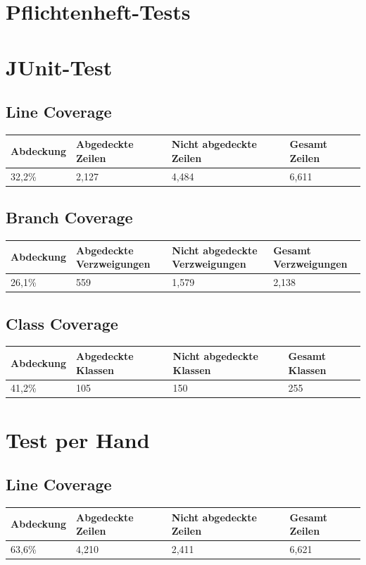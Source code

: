 \documentclass[10pt]{scrreprt}
\begin{document}
\section{Pflichtenheft-Tests}
\section{JUnit-Test}
\subsection{Line Coverage}
\begin{longtable}{|l|p{}|p{}|p{}|}
\hline
Abdeckung & Abgedeckte Zeilen & Nicht abgedeckte Zeilen & Gesamt Zeilen \\
\hline
\hline
32,2\% & 2,127 & 4,484 & 6,611 \\
\hline
\end{longtable}
\subsection{Branch Coverage}
\begin{longtable}{|l|p{}|p{}|p{}|}
\hline
Abdeckung & Abgedeckte Verzweigungen & Nicht abgedeckte Verzweigungen & Gesamt Verzweigungen \\
\hline
\hline
26,1\% & 559 & 1,579 & 2,138 \\
\hline
\end{longtable}
\subsection{Class Coverage}
\begin{longtable}{|l|p{}|p{}|p{}|}
\hline
Abdeckung & Abgedeckte Klassen & Nicht abgedeckte Klassen & Gesamt Klassen \\
\hline
\hline
41,2\% & 105 & 150 & 255 \\
\hline
\end{longtable}
\section{Test per Hand}
\subsection{Line Coverage}
\begin{longtable}{|l|p{}|p{}|p{}|}
\hline
Abdeckung & Abgedeckte Zeilen & Nicht abgedeckte Zeilen & Gesamt Zeilen \\
\hline
\hline
63,6\% & 4,210 & 2,411 & 6,621 \\
\hline
\end{longtable}
\end{document}
